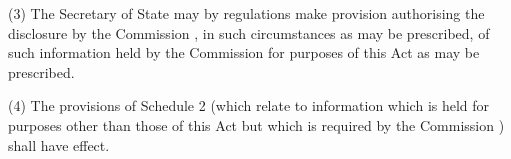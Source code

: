 \documentclass[12pt,a4paper]{article}
\begin{document}
%
%
%

(3) The Secretary of State may by regulations make provision authorising the disclosure by 
the Commission%
, in such circumstances as may be prescribed, of such information held by 
the Commission  %
for purposes of this Act as may be prescribed.

(4) The provisions of Schedule 2 (which relate to information which is held for purposes other than those of this Act but which is required by the 
Commission%
) shall have effect.
\end{document}
